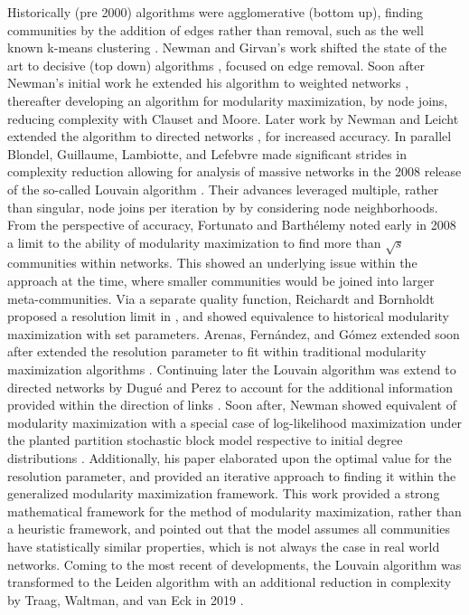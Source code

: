 \documentclass[a4paper, 10pt, twocolumn]{article}
\begin{document}
Historically (pre 2000) algorithms were agglomerative (bottom up), finding communities by the addition of edges rather than removal, such as the well known k-means clustering \cite{least_squares_PCM, some_methods}.
Newman and Girvan's work shifted the state of the art to decisive (top down) algorithms \cite{com_struct_in_soc_and_bio}, focused on edge removal.
Soon after Newman's initial work he extended his algorithm to weighted networks \cite{analysis_of_wnets}, thereafter developing an algorithm for modularity maximization, by node joins, reducing complexity \cite{finding_comm_struct} with Clauset and Moore.
Later work by Newman and Leicht extended the algorithm to directed networks \cite{com_struct_indir}, for increased accuracy.
In parallel Blondel, Guillaume, Lambiotte, and Lefebvre made significant strides in complexity reduction allowing for analysis of massive networks in the 2008 release of the so-called Louvain algorithm \cite{louvain}.
Their advances leveraged multiple, rather than singular, node joins per iteration by by considering node neighborhoods.
From the perspective of accuracy, Fortunato and Barth{\'{e}}lemy noted early in 2008 a limit to the ability of modularity maximization to find more than $ \sqrt{s} $ communities within networks.
This showed an underlying issue within the approach at the time, where smaller communities would be joined into larger meta-communities.
Via a separate quality function, Reichardt and Bornholdt proposed a resolution limit in \cite{statistical_mechanics}, and showed equivalence to historical modularity maximization with set parameters.
Arenas, Fern{\'{a}}ndez, and G{\'{o}}mez extended soon after extended the resolution parameter to fit within traditional modularity maximization algorithms \cite{different_resolution_levels}.
Continuing later the Louvain algorithm was extend to directed networks by Dugu{\'{e}} and Perez to account for the additional information provided within the direction of links \cite{directed_louvain}.
Soon after, Newman showed equivalent of modularity maximization with a special case of log-likelihood maximization under the planted partition stochastic block model respective to initial degree distributions \cite{equivalence_between}.
Additionally, his paper elaborated upon the optimal value for the resolution parameter, and provided an iterative approach to finding it within the generalized modularity maximization framework.
This work provided a strong mathematical framework for the method of modularity maximization, rather than a heuristic framework, and pointed out that the model assumes all communities have statistically similar properties, which is not always the case in real world networks.
Coming to the most recent of developments, the Louvain algorithm was transformed to the Leiden algorithm with an additional reduction in complexity by Traag, Waltman, and van Eck in 2019 \cite{louvain_2_leiden}.
\end{document}
